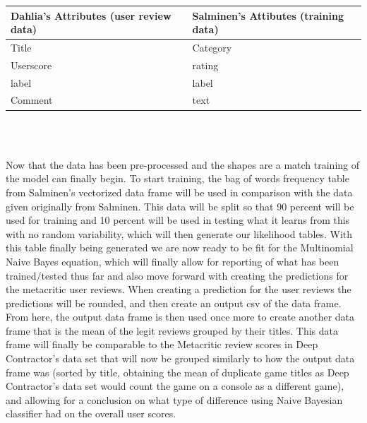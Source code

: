 \documentclass{article}
\begin{document}
\begin{tabular}{ |p{6cm}|p{6cm}|  }
         \hline
           Dahlia's Attributes (user review data) &Salminen's Attibutes (training data)\\
         \hline
         Title&Category\\
         Userscore&rating\\
         label&label\\
         Comment&text\\
         \hline
\end{tabular}
\\ \\
\par Now that the data has been pre-processed and the shapes are a match training of the model can finally begin. To start training, the bag of words frequency table from Salminen's vectorized data frame will be used in comparison with the data given originally from Salminen. This data will be split so that 90 percent will be used for training and 10 percent will be used in testing what it learns from this with no random variability, which will then generate our likelihood tables. With this table finally being generated we are now ready to be fit for the Multinomial Naive Bayes equation, which will finally allow for reporting of what has been trained/tested thus far and also move forward with creating the predictions for the metacritic user reviews. When creating a prediction for the user reviews the predictions will be rounded, and then create an output csv of the data frame. From here, the output data frame is then used once more to create another data frame that is the mean of the legit reviews grouped by their titles. This data frame will finally be comparable to the Metacritic review scores in Deep Contractor's data set that will now be grouped similarly to how the output data frame was (sorted by title, obtaining the mean of duplicate game titles as Deep Contractor's data set would count the game on a console as a different game), and allowing for a conclusion on what type of difference using Naive Bayesian classifier had on the overall user scores.
\end{document}
